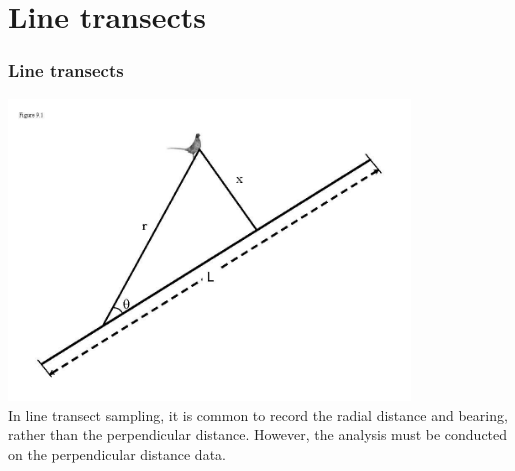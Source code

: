 \documentclass[color=usenames,dvipsnames]{beamer}\usepackage[]{graphicx}\usepackage[]{color}
\begin{document}
\section{Line transects}



\begin{frame}
  \frametitle{Line transects}
  \centering
  \includegraphics[width=0.8\textwidth]{figs/Fig9-1} \\
  In line transect sampling, it is common to record the radial
  distance and bearing, rather than the perpendicular
  distance. However, the analysis must be conducted on the
  perpendicular distance data. \\
\end{frame}
\end{document}
